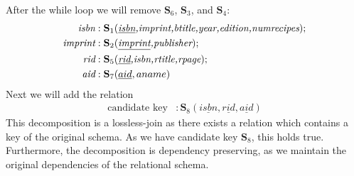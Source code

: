 \documentclass[letterpaper]{article}
\theoremstyle{plain}
\theoremstyle{definition}
\theoremstyle{remark}
\begin{document}
After the while loop we will remove $\textbf{S}_6$, $\textbf{S}_3$, and $\textbf{S}_4$:
\begin{align*}
    \textit{isbn}&: \textbf{S}_1 (\textit{\underline{isbn},imprint,btitle,year,edition,numrecipes});\\
    \textit{imprint}&: \textbf{S}_2 (\textit{\underline{imprint},publisher});\\
    \textit{rid}&: \textbf{S}_5 (\textit{\underline{rid},isbn,rtitle,rpage});\\
    \textit{aid}&: \textbf{S}_7 (\underline{aid},aname)
\end{align*}
Next we will add the relation
\begin{align*}
    \text{candidate key}&:\textbf{S}_8(\underline{isbn},\underline{rid},\underline{aid})
\end{align*}
This decomposition is a lossless-join as there exists a relation which contains a key of the original schema. As we have candidate key $\textbf{S}_8$, this holds true. Furthermore, the decomposition is dependency preserving, as we maintain the original dependencies of the relational schema.
\end{document}
